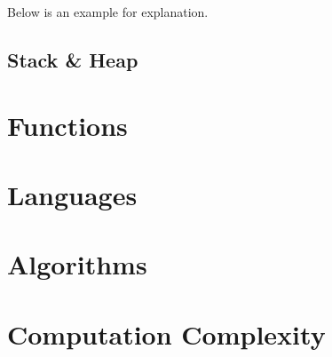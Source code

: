 Below is an example for explanation.




\subsection{Stack \& Heap}

\section{Functions}

\section{Languages}

\section{Algorithms}

\appendix

\section{Computation Complexity}


